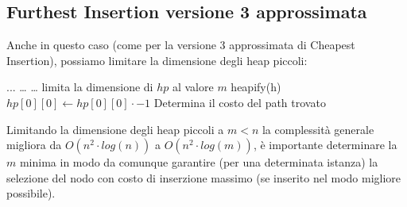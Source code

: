 \documentclass[a4paper,12pt]{report}
\begin{document}
\subsection{Furthest Insertion versione 3 approssimata}
Anche in questo caso (come per la versione 3 approssimata di Cheapest Insertion), possiamo limitare la dimensione degli heap piccoli:
\begin{tcolorbox}[colframe=black, colback=white, boxrule=0.5pt, title=Furthest Insertion Versione 3, coltitle=black, fonttitle=\bfseries, colbacktitle=white, breakable]
  \begin{algorithmic}[1]
    \State ...
      \State \dots
        \State \dots
      \EndFor
        \State limita la dimensione di $hp$ al valore $m$
      \EndFor
      \State heapify(h)
        \State $hp[0][0] \gets hp[0][0] \cdot -1$
      \EndFor
    \EndWhile
    \State Determina il costo del path trovato
  \end{algorithmic}
\end{tcolorbox}
Limitando la dimensione degli heap piccoli a $m < n$ la complessità generale migliora da $O(n^2 \cdot log(n))$ a $O(n^2 \cdot log(m))$, è importante determinare la $m$ minima in modo da comunque garantire (per una determinata istanza) la selezione del nodo con costo di inserzione massimo (se inserito nel modo migliore possibile).
\end{document}
